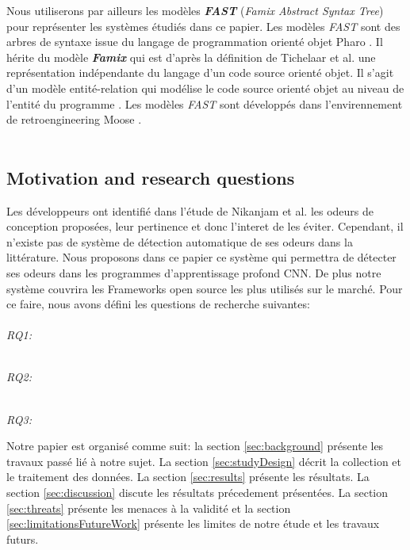 Nous utiliserons par ailleurs les modèles \textbf{\emph{FAST}} (\emph{Famix Abstract Syntax Tree}) pour représenter les systèmes étudiés dans ce papier. Les modèles
\emph{FAST} sont des arbres de syntaxe issue du langage de programmation orienté objet
Pharo \cite{black2010pharo, bergel2013deep, zaitsev2020characterizing}. Il hérite du modèle \textbf{\emph{Famix}} qui est d'après la définition de
Tichelaar et al. une représentation indépendante du langage d'un code source
orienté objet. Il s'agit d'un modèle entité-relation qui modélise le code source
orienté objet au niveau de l'entité du programme \cite{891485} \cite{demeyer1999famix}.
Les modèles \emph{FAST} sont développés dans l'envirennement de retroengineering Moose \cite{ducasse2000moose}.\\\\



\subsection{Motivation and research questions}
Les développeurs ont identifié dans l'étude de Nikanjam et al. les odeurs de
conception proposées, leur pertinence et donc l'interet de les éviter.
Cependant, il n'existe pas de système de détection automatique de ses odeurs
dans la littérature. Nous proposons dans ce papier ce système qui
permettra de détecter ses odeurs dans les programmes d'apprentissage profond
CNN. De plus notre système couvrira les Frameworks open source les plus utilisés sur le
marché. Pour ce faire, nous avons défini les questions de recherche suivantes:\\

\emph{\\RQ1:\RQOne} %

\emph{\\RQ2:\RQTwo} %

\emph{\\RQ3:\RQThree} %

Notre papier est organisé comme suit: la section \ref{sec:background} présente
les travaux passé lié à notre sujet. La section \ref{sec:studyDesign} décrit la
collection et le traitement des données. La section \ref{sec:results} présente
les résultats. La section \ref{sec:discussion} discute les
résultats précedement présentées. La section \ref{sec:threats} présente les menaces à la
validité et la section \ref{sec:limitationsFutureWork} présente les limites de notre étude et les travaux futurs.

